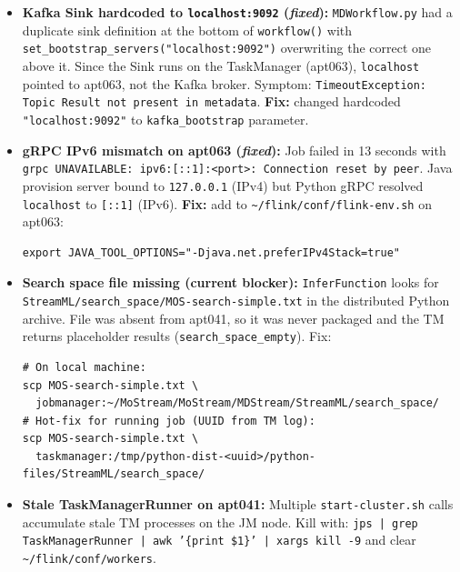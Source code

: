 \documentclass[11pt,a4paper]{article}
\begin{document}
\begin{itemize}
        \texttt{RuntimeError: Channel closed prematurely}. Root cause: Beam's 1-second
        bundle timeout fired during CPU-intensive NPMM training.
        \textbf{Fix applied:} added to \texttt{\textasciitilde/flink/conf/config.yaml} on apt041:
        \begin{lstlisting}
python.fn-execution.bundle.time: 60000
python.fn-execution.bundle.size: 1
        \end{lstlisting}
        Result: job now runs past training and reaches the Kafka Sink stage.
  \item \textbf{Kafka Sink hardcoded to \texttt{localhost:9092} (\textit{fixed}):}
        \texttt{MDWorkflow.py} had a duplicate sink definition at the bottom of \texttt{workflow()}
        with \texttt{set\_bootstrap\_servers("localhost:9092")} overwriting the correct one above it.
        Since the Sink runs on the TaskManager (apt063), \texttt{localhost} pointed to apt063, not
        the Kafka broker. Symptom: \texttt{TimeoutException: Topic Result not present in metadata}.
        \textbf{Fix:} changed hardcoded \texttt{"localhost:9092"} to \texttt{kafka\_bootstrap} parameter.
  \item \textbf{gRPC IPv6 mismatch on apt063 (\textit{fixed}):} Job failed in 13 seconds with
        \texttt{grpc UNAVAILABLE: ipv6:[::1]:<port>: Connection reset by peer}.
        Java provision server bound to \texttt{127.0.0.1} (IPv4) but Python gRPC resolved
        \texttt{localhost} to \texttt{[::1]} (IPv6).
        \textbf{Fix:} add to \texttt{\textasciitilde/flink/conf/flink-env.sh} on apt063:
        \begin{lstlisting}
export JAVA_TOOL_OPTIONS="-Djava.net.preferIPv4Stack=true"
        \end{lstlisting}
  \item \textbf{Search space file missing (current blocker):} \texttt{InferFunction} looks for
        \texttt{StreamML/search\_space/MOS-search-simple.txt} in the distributed Python archive.
        File was absent from apt041, so it was never packaged and the TM returns placeholder
        results (\texttt{search\_space\_empty}). Fix:
        \begin{lstlisting}
# On local machine:
scp MOS-search-simple.txt \
  jobmanager:~/MoStream/MoStream/MDStream/StreamML/search_space/
# Hot-fix for running job (UUID from TM log):
scp MOS-search-simple.txt \
  taskmanager:/tmp/python-dist-<uuid>/python-files/StreamML/search_space/
        \end{lstlisting}
  \item \textbf{Stale TaskManagerRunner on apt041:} Multiple \texttt{start-cluster.sh} calls
        accumulate stale TM processes on the JM node. Kill with:
        \texttt{jps | grep TaskManagerRunner | awk '\{print \$1\}' | xargs kill -9}
        and clear \texttt{\textasciitilde/flink/conf/workers}.
\end{itemize}
\end{document}
